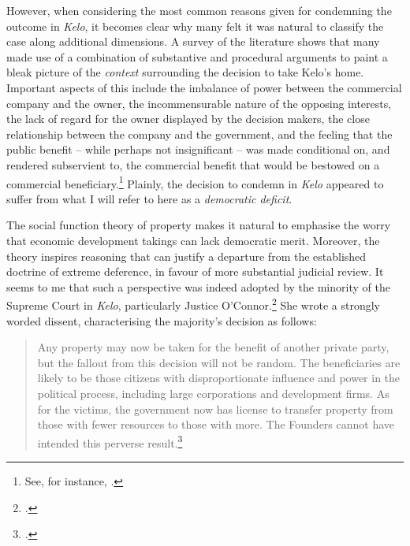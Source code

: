 However, when considering the most common reasons given for condemning the outcome in {\it Kelo}, it becomes clear why many felt it was natural to classify the case along additional dimensions. A survey of the literature shows that many made use of a combination of substantive and procedural arguments to paint a bleak picture of the {\it context} surrounding the decision to take Kelo's home. Important aspects of this include the imbalance of power between the commercial company and the owner, the incommensurable nature of the opposing interests, the lack of regard for the owner displayed by the decision makers, the close relationship between the company and the government, and the feeling that the public benefit -- while perhaps not insignificant -- was made conditional on, and rendered subservient to, the commercial benefit that would be bestowed on a commercial beneficiary.\footnote{See, for instance, \cite{underkuffler06,somin07,sandefur06,cohen06,hafetz09,hudson10}.} Plainly, the decision to condemn in {\it Kelo} appeared to suffer from what I will refer to here as a {\it democratic deficit}.

The social function theory of property makes it natural to emphasise the worry that economic development takings can lack democratic merit. Moreover, the theory inspires reasoning that can justify a departure from the established doctrine of extreme deference, in favour of more substantial judicial review. It seems to me that such a perspective was indeed adopted by the minority of the Supreme Court in {\it Kelo}, particularly Justice O'Connor.\footnote{\cite[494-505]{kelo05}.} She wrote a strongly worded dissent, characterising the majority's decision as follows:

\begin{quote}
Any property may now be taken for the benefit of another private party, but the fallout from this decision will not be random. The beneficiaries are likely to be those citizens with disproportionate influence and power in the political process, including large corporations and development firms. As for the victims, the government now has license to transfer property from those with fewer resources to those with more. The Founders cannot have intended this perverse result.\footcite[505]{kelo05}
\end{quote}

